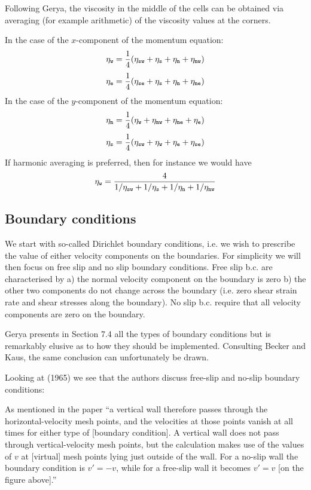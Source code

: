 Following Gerya, the viscosity in the middle of the cells
can be obtained via averaging (for example arithmetic) of the viscosity values at the corners.

In the case of the $x$-component of the momentum equation:
\[
\eta_{\tt w} = \frac{1}{4}(\eta_{\tt sw}+\eta_{\tt s}+\eta_{\tt n} + \eta_{\tt nw})
\]
\[
\eta_{\tt e} = \frac{1}{4}(\eta_{\tt se}+\eta_{\tt s}+\eta_{\tt n} + \eta_{\tt ne})
\]
In the case of the $y$-component of the momentum equation:
\[
\eta_{\tt n} = \frac{1}{4}(\eta_{\tt w}+\eta_{\tt nw}+\eta_{\tt ne} + \eta_{\tt e})
\]
\[
\eta_{\tt s} = \frac{1}{4}(\eta_{\tt sw}+\eta_{\tt w}+\eta_{\tt e} + \eta_{\tt se})
\]
If harmonic averaging is preferred, then for instance we would have
\[
\eta_{\tt w} = \frac{4}{1/\eta_{\tt sw}+1/\eta_{\tt s}+1/\eta_{\tt n} + 1/\eta_{\tt nw} }
\]


\subsection{Boundary conditions}

We start with so-called Dirichlet boundary conditions, i.e. we wish 
to prescribe the value of either velocity components on the boundaries.
For simplicity we will then focus on free slip and no slip boundary conditions.
Free slip b.c. are characterised by a) the normal velocity component on the boundary is zero 
b) the other two components do not change across the boundary (i.e.
zero shear strain rate and shear stresses along the boundary).
No slip b.c. require that all velocity components are zero on the boundary.

Gerya presents in Section 7.4 all the types of boundary conditions but is remarkably elusive 
as to how they should be implemented. Consulting Becker and Kaus, the same conclusion can 
unfortunately be drawn.

Looking at \textcite{hawe65} (1965)
we see that the authors discuss free-slip and no-slip boundary conditions:
\begin{center}
\end{center}
As mentioned in the paper ``a vertical wall therefore passes through the horizontal-velocity mesh points,
and the velocities at those points vanish at all times for either type of [boundary condition].
A vertical wall does not pass through vertical-velocity mesh points, but the calculation makes use
of the values of $v$ at [virtual] mesh points lying just outside of the wall. For a no-slip wall
the boundary condition is $v'=-v$, while for a free-slip wall it becomes $v'=v$ [on the figure above].''


